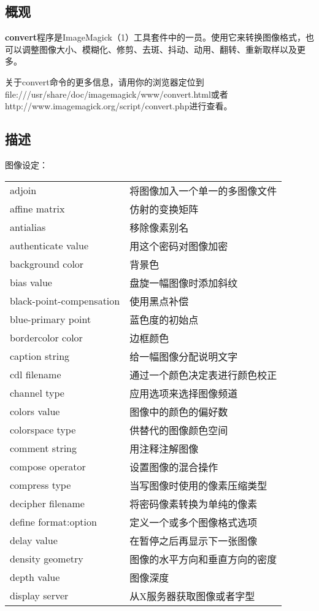 \documentclass{article}
\begin{document}
\begin{CJK*}{UTF8}{gbsn}
\subsection{概观}
\textbf{convert}程序是ImageMagick（1）工具套件中的一员。使用它来转换图像格式，也可以调整图像大小、模糊化、修剪、去斑、抖动、动用、翻转、重新取样以及更多。

关于convert命令的更多信息，请用你的浏览器定位到file:///usr/share/doc/imagemagick/www/convert.html或者http://www.imagemagick.org/script/convert.php进行查看。
\subsection{描述}
图像设定：
\begin{flushleft}
\begin{longtable}{@{-}ll}
adjoin&将图像加入一个单一的多图像文件\\
affine matrix&仿射的变换矩阵\\
antialias&移除像素别名\\
authenticate value&用这个密码对图像加密\\
background color&背景色\\
bias value&盘旋一幅图像时添加斜纹\\
black-point-compensation&使用黑点补偿\\
blue-primary point&蓝色度的初始点\\
bordercolor color&边框颜色\\
caption string&给一幅图像分配说明文字\\
cdl filename&通过一个颜色决定表进行颜色校正\\
channel type&应用选项来选择图像频道\\
colors value&图像中的颜色的偏好数\\
colorspace type&供替代的图像颜色空间\\
comment string&用注释注解图像\\
compose operator&设置图像的混合操作\\
compress type&当写图像时使用的像素压缩类型\\
decipher filename&将密码像素转换为单纯的像素\\
define format:option&定义一个或多个图像格式选项\\
delay value&在暂停之后再显示下一张图像\\
density geometry&图像的水平方向和垂直方向的密度\\
depth value&图像深度\\
display server&从X服务器获取图像或者字型\\

\end{longtable}
\end{flushleft}
\end{CJK*}
\end{document}
